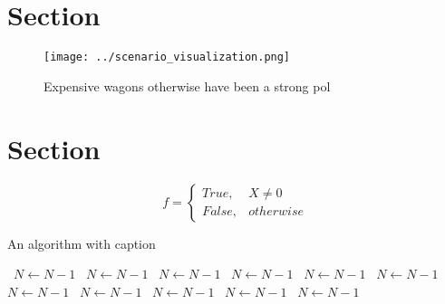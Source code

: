 \documentclass[a4paper]{article}
\begin{document}
\section{Section}

\begin{figure}
\centering
\texttt{[image: ../scenario\_visualization.png]}
\caption{Expensive wagons otherwise have been a strong pol
}
\end{figure}
 
\section{Section}

\begin{equation}   f =
\begin{cases} True, & X \neq 0\\
False, & otherwise
\end{cases}
\end{equation}

\begin{algorithm}
\caption{An algorithm with caption}
\begin{algorithmic}
\    \State $N \gets N - 1$
\    \State $N \gets N - 1$
\    \State $N \gets N - 1$
\    \State $N \gets N - 1$
\    \State $N \gets N - 1$
\    \State $N \gets N - 1$
\    \State $N \gets N - 1$
\    \State $N \gets N - 1$
\    \State $N \gets N - 1$
\    \State $N \gets N - 1$
\    \State $N \gets N - 1$
\EndWhile
\end{algorithmic}
\end{algorithm}
\end{document}
